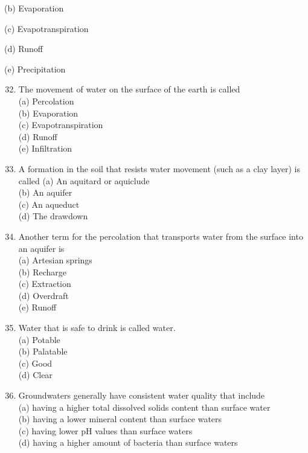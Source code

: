 \documentclass[10pt]{article}
\begin{document}
(b) Evaporation

(c) Evapotranspiration

(d) Runoff

(e) Precipitation

\begin{enumerate}
  \setcounter{enumi}{31}
  \item The movement of water on the surface of the earth is called\\
(a) Percolation\\
(b) Evaporation\\
(c) Evapotranspiration\\
(d) Runoff\\
(e) Infiltration\\

  \item A formation in the soil that resists water movement (such as a clay layer) is called
(a) An aquitard or aquiclude\\
(b) An aquifer\\
(c) An aqueduct\\
(d) The drawdown\\

  \item Another term for the percolation that transports water from the surface into an aquifer is\\
(a) Artesian springs\\
(b) Recharge\\
(c) Extraction\\
(d) Overdraft\\
(e) Runoff\\

  \item Water that is safe to drink is called water.\\
(a) Potable\\
(b) Palatable\\
(c) Good\\
(d) Clear\\

  \item Groundwaters generally have consistent water quality that include\\
(a) having a higher total dissolved solids content than surface water\\
(b) having a lower mineral content than surface waters\\
(c) having lower $\mathrm{pH}$ values than surface waters\\
(d) having a higher amount of bacteria than surface waters\\


\end{enumerate}
\end{document}
